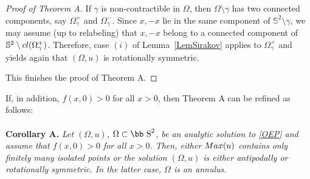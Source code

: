 \documentclass[11pt]{article}
\def\s{\hbox{\bb S}}
\numberwithin{equation} {section}
\begin{document}
\begin{proof}[Proof of Theorem A]
If $\gamma$ is non-contractible in $\Omega$, then $\Omega\setminus \gamma$ has two connected components, say $\Omega_\gamma^+$ and $\Omega_\gamma^-$. Since $x,-x$ lie in the same component of $\mathbb{S}^2\setminus \gamma$, we may assume (up to relabeling) that $x,-x$ belong to a connected component of $\mathbb{S}^2\setminus {\rm cl}(\Omega_\gamma^+)$. Therefore, case $(i)$ of Lemma~\ref{LemSirakov} applies to $\Omega_\gamma^+$ and yields again that $(\Omega,u)$ is rotationally symmetric.

This finishes the proof of Theorem A.
\end{proof}


If, in addition, $f(x,0)>0$ for all $x>0$, then Theorem A can be refined as follows:
\\
\\
{\bf Corollary A.} {\it Let $(\Omega, u)$, $\Omega \subset \s^2$, be an analytic solution to \eqref{OEP} and assume that $f(x,0)>0$ for all $x>0$. Then, either $\textup{Max}(u)$ contains only finitely many isolated points or the solution $(\Omega ,u)$ is either antipodally or rotationally symmetric. In the latter case, $\Omega$ is an annulus.}
\end{document}
